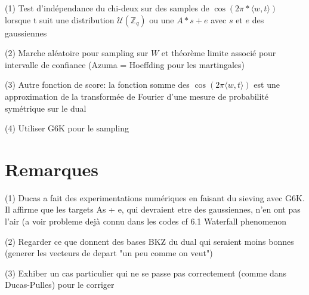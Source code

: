 \documentclass{article}
\begin{document}
(1) Test d'indépendance du chi-deux sur des samples de $\cos(2  \pi * \langle w , t \rangle)$ lorsque t suit une distribution $\mathcal U(\mathbb Z_q)$ ou une $A * s + e$ avec $s$ et $e$ des gaussiennes 
 
(2) Marche aléatoire pour sampling sur $W$ et théorème limite associé pour intervalle de confiance (Azuma = Hoeffding pour les martingales) 
 
(3) Autre fonction de score: la fonction somme des $\cos(2 \pi \langle w,t\rangle )$ est une approximation de la transformée de Fourier d'une mesure de probabilité symétrique sur le dual

(4) Utiliser G6K pour le sampling

\section{Remarques}   

(1) Ducas a fait des experimentations numériques en faisant du sieving avec G6K. Il affirme que les targets As + e, qui devraient etre des gaussiennes, n'en ont pas l'air (a voir probleme dejà connu dans les codes cf 6.1 Waterfall phenomenon

(2) Regarder ce que donnent des bases BKZ du dual qui seraient moins bonnes (generer les vecteurs de depart "un peu comme on veut")

(3) Exhiber un cas particulier qui ne se passe pas correctement (comme dans Ducas-Pulles) pour le corriger



\end{document}
